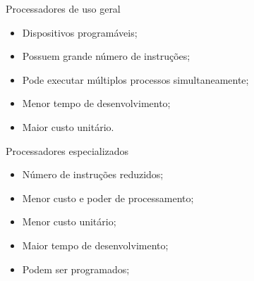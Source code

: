 \begin{frame}{Processadores de uso geral}

    \begin{itemize}
        \item Dispositivos programáveis;
        \item Possuem grande número de instruções;
        \item Pode executar múltiplos processos simultaneamente;
        \item Menor tempo de desenvolvimento;
        \item Maior custo unitário.
        
    \end{itemize}

\end{frame}

\begin{frame}{Processadores especializados}

    \begin{itemize}
        \item Número de instruções reduzidos;
        \item Menor custo e poder de processamento;
        \item Menor custo unitário; 
        \item Maior tempo de desenvolvimento;
        \item Podem ser programados;
    \end{itemize}

    
\end{frame}


